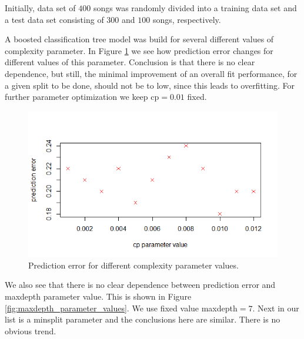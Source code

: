 \documentclass{article}
\begin{document}
Initially, data set of $400$ songs was randomly divided into a training data set and a test data set consisting of $300$ and $100$ songs, respectively. 

A boosted classification tree model was build for several different values of complexity parameter. In Figure \ref{fig:complexity_parameter_values} we see how prediction error changes for different values of this parameter. Conclusion is that there is no clear dependence, but still, the minimal improvement of an overall fit performance, for a given split to be done, should not be to low, since this leads to overfitting. For further parameter optimization we keep {\selectfont cp$=0.01$} fixed.
 
 \begin{figure}[h] %
\includegraphics[scale=0.65]{figs/cp_values.png}
\centering
\caption{Prediction error for different complexity parameter values.} \label{fig:complexity_parameter_values}
\end{figure}
 
 We also see that there is no clear dependence between prediction error and {\selectfont maxdepth} parameter value. This is shown in Figure \ref{fig:maxdepth_parameter_values}. We use fixed value {\selectfont maxdepth$=7$}. Next in our list is a {\selectfont minsplit} parameter and the conclusions here are similar. There is no obvious trend.
 
\end{document}
